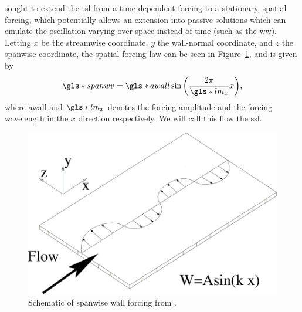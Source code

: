 \textcite{viotti2009} sought to extend the \gls*{tsl} from a time-dependent forcing to a stationary, spatial forcing, which potentially allows an extension into passive solutions which can emulate the oscillation varying over space instead of time (such as the \gls*{ww}). %
Letting $x$ be the streamwise coordinate, $y$ the wall-normal coordinate, and $z$ the spanwise coordinate, the spatial forcing law can be seen in Figure~\ref{fig:ssl}, and is given by
\begin{equation}
	\gls*{spanwv} = \gls*{awall}\sin{\left( \frac{2\pi}{\gls*{lm}_x} x \right)} 
,\end{equation}
where \gls*{awall} and $\gls*{lm}_x$ denotes the forcing amplitude and the forcing wavelength in the $x$ direction respectively. We will call this flow the \gls*{ssl}.

\begin{figure}[htbp]
	\centering
	\includegraphics[width=0.5\linewidth]{introduction/fig/ssl.png}
	\caption[Schematic of spanwise wall forcing]{Schematic of spanwise wall forcing from \cite{viotti2009}.}
	\label{fig:ssl}
\end{figure}

